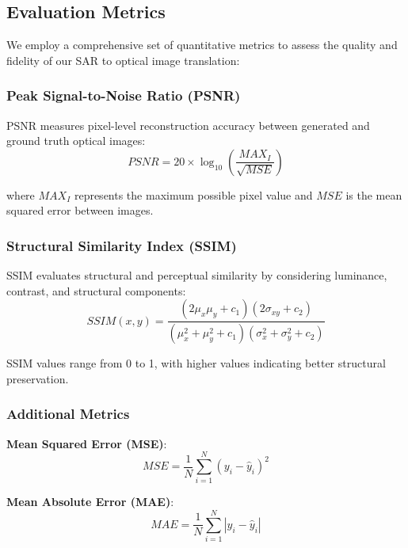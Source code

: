 \subsection{Evaluation Metrics}

We employ a comprehensive set of quantitative metrics to assess the quality and fidelity of our SAR to optical image translation:

\subsubsection{Peak Signal-to-Noise Ratio (PSNR)}

PSNR measures pixel-level reconstruction accuracy between generated and ground truth optical images:
\begin{equation}
PSNR = 20 \times \log_{10}\left(\frac{MAX_I}{\sqrt{MSE}}\right)
\end{equation}

where $MAX_I$ represents the maximum possible pixel value and $MSE$ is the mean squared error between images.

\subsubsection{Structural Similarity Index (SSIM)}

SSIM evaluates structural and perceptual similarity by considering luminance, contrast, and structural components:
\begin{equation}
SSIM(x,y) = \frac{(2\mu_x\mu_y + c_1)(2\sigma_{xy} + c_2)}{(\mu_x^2 + \mu_y^2 + c_1)(\sigma_x^2 + \sigma_y^2 + c_2)}
\end{equation}

SSIM values range from 0 to 1, with higher values indicating better structural preservation.

\subsubsection{Additional Metrics}

\textbf{Mean Squared Error (MSE)}:
\begin{equation}
MSE = \frac{1}{N} \sum_{i=1}^{N} (y_i - \hat{y}_i)^2
\end{equation}

\textbf{Mean Absolute Error (MAE)}:
\begin{equation}
MAE = \frac{1}{N} \sum_{i=1}^{N} |y_i - \hat{y}_i|
\end{equation}

